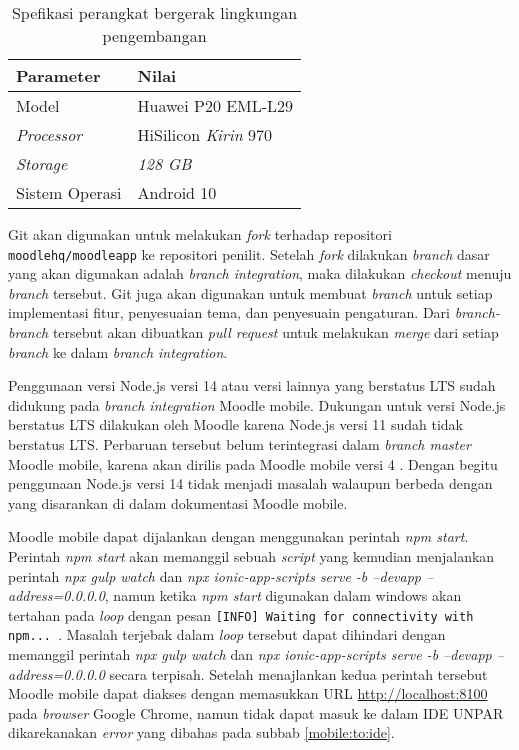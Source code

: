 \begin{enumerate}
\begin{table}[ht]
\caption{Spefikasi perangkat bergerak lingkungan pengembangan}
\centering
\begin{tabular}{|l | l |}
\hline
\textbf{Parameter} & \textbf{Nilai} \\  \hline
Model & Huawei P20 EML-L29 \\ \hline
\textit{Processor}  &  HiSilicon \textit{Kirin} 970 \\ \hline
\textit{Storage} & \textit{128 GB} \\ \hline
Sistem Operasi & Android 10 \\
\hline
\end{tabular}
\label{spec:mobile}
\end{table}

\end{enumerate}

Git akan digunakan untuk melakukan \textit{fork} terhadap repositori \texttt{moodlehq/moodleapp} ke repositori penilit. Setelah \textit{fork} dilakukan \textit{branch} dasar yang akan digunakan adalah \textit{branch integration}, maka dilakukan \textit{checkout} menuju \textit{branch} tersebut. Git juga akan digunakan untuk membuat \textit{branch} untuk setiap implementasi fitur, penyesuaian tema, dan penyesuain pengaturan. Dari \textit{branch-branch} tersebut akan dibuatkan \textit{pull request} untuk melakukan \textit{merge} dari setiap \textit{branch} ke dalam \textit{branch integration}.

Penggunaan versi Node.js versi 14 atau versi lainnya yang berstatus LTS sudah didukung pada \textit{branch integration} Moodle mobile. Dukungan untuk versi Node.js berstatus LTS dilakukan oleh Moodle karena Node.js versi 11 sudah tidak berstatus LTS. Perbaruan tersebut belum terintegrasi dalam \textit{branch master} Moodle mobile, karena akan dirilis pada Moodle mobile versi 4\cite{MoodleTracker:Node11+} . Dengan begitu penggunaan Node.js versi 14 tidak menjadi masalah walaupun berbeda dengan yang disarankan di dalam dokumentasi Moodle mobile. 

Moodle mobile dapat dijalankan dengan menggunakan perintah \textit{npm start}.  Perintah \textit{npm start} akan memanggil sebuah \textit{script} yang kemudian menjalankan perintah \textit{npx gulp watch} dan \textit{npx ionic-app-scripts serve -b --devapp --address=0.0.0.0}, namun ketika \textit{npm start} digunakan dalam windows akan tertahan pada \textit{loop} dengan pesan \texttt{[INFO] Waiting for connectivity with npm...	}. Masalah terjebak dalam \textit{loop} tersebut dapat dihindari dengan memanggil perintah \textit{npx gulp watch} dan \textit{npx ionic-app-scripts serve -b --devapp --address=0.0.0.0} secara terpisah. Setelah menajlankan kedua perintah tersebut Moodle mobile dapat diakses dengan memasukkan URL \url{http://localhost:8100} pada \textit{browser} Google Chrome, namun tidak dapat masuk ke dalam IDE UNPAR dikarekanakan \textit{error} yang dibahas pada subbab \ref{mobile:to:ide}. 

